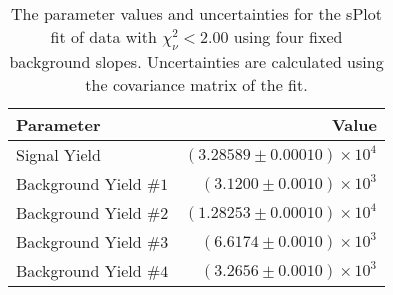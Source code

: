 
\begin{table}[ht]
    \begin{center}
        \begin{tabular}{lr}\toprule
            Parameter & Value \\\midrule
            Signal Yield & $(3.28589 \pm 0.00010) \times 10^{4}$ \\
            Background Yield $\#1$ & $(3.1200 \pm 0.0010) \times 10^{3}$ \\
            Background Yield $\#2$ & $(1.28253 \pm 0.00010) \times 10^{4}$ \\
            Background Yield $\#3$ & $(6.6174 \pm 0.0010) \times 10^{3}$ \\
            Background Yield $\#4$ & $(3.2656 \pm 0.0010) \times 10^{3}$ \\\bottomrule
        \end{tabular}
        \caption{The parameter values and uncertainties for the sPlot fit of data with $\chi^2_\nu < 2.00$ using four fixed background slopes. Uncertainties are calculated using the covariance matrix of the fit.}\label{tab:splot-fit-results-chisqdof-2.00-fixed-4}
    \end{center}
\end{table}
